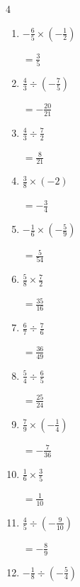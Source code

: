 \begin{multicols}{4}
\begin{enumerate}
        $\displaystyle =-1$

  \item $\displaystyle -\frac{6}{5}\times{}\left(-\frac{1}{2}\right)$

        $\displaystyle =\frac{3}{5}$

  \item $\displaystyle \frac{4}{3}\div{}\left(-\frac{7}{5}\right)$

        $\displaystyle =-\frac{20}{21}$

  \item $\displaystyle \frac{4}{3}\div{}\frac{7}{2}$

        $\displaystyle =\frac{8}{21}$

\columnbreak %

  \item $\displaystyle \frac{3}{8}\times{}\left(-2\right)$

        $\displaystyle =-\frac{3}{4}$

  \item $\displaystyle -\frac{1}{6}\times{}\left(-\frac{5}{9}\right)$

        $\displaystyle =\frac{5}{54}$

  \item $\displaystyle \frac{5}{8}\times{}\frac{7}{2}$

        $\displaystyle =\frac{35}{16}$

  \item $\displaystyle \frac{6}{7}\div{}\frac{7}{6}$

        $\displaystyle =\frac{36}{49}$

  \item $\displaystyle \frac{5}{4}\div{}\frac{6}{5}$

        $\displaystyle =\frac{25}{24}$

  \item $\displaystyle \frac{7}{9}\times{}\left(-\frac{1}{4}\right)$

        $\displaystyle =-\frac{7}{36}$

  \item $\displaystyle \frac{1}{6}\times{}\frac{3}{5}$

        $\displaystyle =\frac{1}{10}$

  \item $\displaystyle \frac{4}{5}\div{}\left(-\frac{9}{10}\right)$

        $\displaystyle =-\frac{8}{9}$

  \item $\displaystyle -\frac{1}{8}\div{}\left(-\frac{5}{4}\right)$


\end{enumerate}
\end{multicols}
